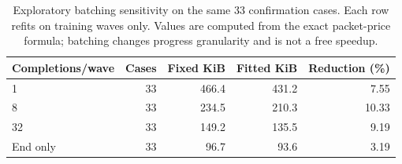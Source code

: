 \begin{table}[t]
\centering\small
\caption{Exploratory batching sensitivity on the same 33 confirmation cases. Each row refits on training waves only. Values are computed from the exact packet-price formula; batching changes progress granularity and is not a free speedup.}\label{tab:batching}
\begin{tabular}{@{}lrrrr@{}}
\toprule
Completions/wave & Cases & Fixed KiB & Fitted KiB & Reduction (\%)\\
\midrule
1 & 33 & 466.4 & 431.2 & 7.55\\
8 & 33 & 234.5 & 210.3 & 10.33\\
32 & 33 & 149.2 & 135.5 & 9.19\\
End only & 33 & 96.7 & 93.6 & 3.19\\
\bottomrule
\end{tabular}
\end{table}
